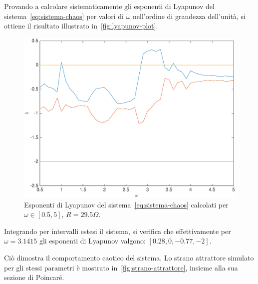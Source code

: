 Provando a calcolare sistematicamente gli esponenti di Lyapunov del sistema~\ref{eq:sistema-chaos} per valori di $\omega$ nell'ordine di grandezza dell'unità, si ottiene il risultato illustrato in~\autoref{fig:lyapunov-plot}.

\begin{figure}[h]
\centering
\includegraphics[width=\textwidth]{matcont/LyapunovPlot}
\caption{Esponenti di Lyapunov del sistema~\ref{eq:sistema-chaos} calcolati per $\omega \in [0.5, 5]$, $R=29.5 \Omega$.}
\label{fig:lyapunov-plot}
\end{figure}

Integrando per intervalli estesi il sistema, si verifica che effettivamente per $\omega = 3.1415$ gli esponenti di Lyapunov valgono: $[0.28, 0, -0.77, -2]$.

Ciò dimostra il comportamento caotico del sistema. Lo strano attrattore simulato per gli stessi parametri è mostrato in~\autoref{fig:strano-attrattore}, insieme alla sua sezione di Poincaré.

